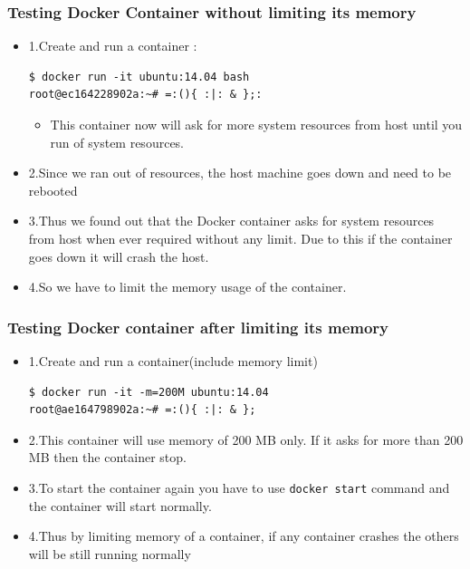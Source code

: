 \documentclass[11pt]{article}
\begin{document}
\subsubsection{Testing Docker Container without limiting its memory}
\label{sec:orgheadline47}
\begin{itemize}
\item 1.Create and run a container :
\begin{verbatim}
$ docker run -it ubuntu:14.04 bash
root@ec164228902a:~# =:(){ :|: & };:
\end{verbatim}
\begin{itemize}
\item This container now will ask for more system resources from host
until you run of system resources.
\end{itemize}
\item 2.Since we ran out of resources, the host machine goes down and need to
be rebooted
\item 3.Thus we found out that the Docker container asks for system
resources from host when ever required without any limit.
Due to this if the container goes down it will crash the host.
\item 4.So we have to limit the memory usage of the container.
\end{itemize}

\subsubsection{Testing Docker container after limiting its memory}
\label{sec:orgheadline48}
\begin{itemize}
\item 1.Create and run a container(include memory limit)
\begin{verbatim}
$ docker run -it -m=200M ubuntu:14.04
root@ae164798902a:~# =:(){ :|: & };
\end{verbatim}
\item 2.This container will use memory of 200 MB only. If it asks for more than
200 MB then the container stop.
\item 3.To start the container again you have to use \texttt{docker start} command and
the container will start normally.
\item 4.Thus by limiting memory of a container, if any container crashes the
others will be still running normally
\end{itemize}
\end{document}
